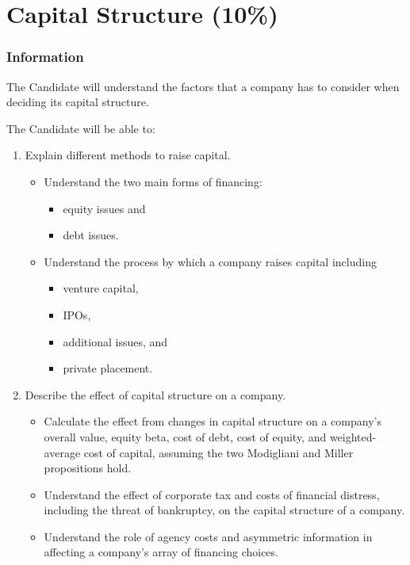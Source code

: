 \chapter[Capital Structure]{Capital Structure (10\%)}

\subsection{Information}

\begin{distributions}[Objective]
The Candidate will understand the factors that a company has to consider when deciding its capital structure.
\end{distributions}

\begin{outcomes}
The Candidate will be able to:
\begin{enumerate}[label = \alph*)]
	\item	Explain different methods to raise capital.
		\begin{knowledge}[]
		\begin{itemize}
		\item	Understand the two main forms of financing: 
			\begin{itemize}
			\item	equity issues and 
			\item	debt issues.
			\end{itemize}
		\item	Understand the process by which a company raises capital including 
			\begin{itemize}
			\item	venture capital, 
			\item	IPOs, 
			\item	additional issues, and 
			\item	private placement.
			\end{itemize}
		\end{itemize}
		\end{knowledge}
	\item	Describe the effect of capital structure on a company.
		\begin{knowledge}[]
		\begin{itemize}
		\item	Calculate the effect from changes in capital structure on a company’s overall value, equity beta, cost of debt, cost of equity, and weighted-average cost of capital, assuming the two Modigliani and Miller propositions hold. 
		\item	Understand the effect of corporate tax and costs of financial distress, including the threat of bankruptcy, on the capital structure of a company.
		\item	Understand the role of agency costs and asymmetric information in affecting a company’s array of financing choices.
		\end{itemize}
		\end{knowledge}
	\end{enumerate}
\end{outcomes}

